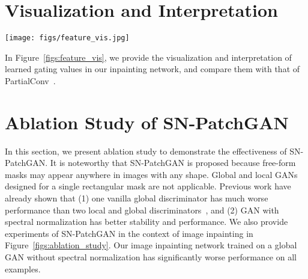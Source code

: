 \documentclass[10pt,twocolumn,letterpaper]{article}
\begin{document}
\section{Visualization and Interpretation} \label{secs:vis_network}
\begin{figure*}[ht]
  \centering
  \vspace*{-1cm}
  \texttt{[image: figs/feature\_vis.jpg]}

  \caption{Comparisons of gated convolution and partial convolution with visualization and interpretation of learned gating values. We first show our inpainting network architecture based on~\cite{yu2018generative} by replacing all convolutions with gated convolutions in the 1st row. Note that for simplicity, the following refinement network in~\cite{yu2018generative} is ignored in the figure. With same settings, we train two models based on gated convolution and partial convolution separately. We then directly visualize intermediate un-normalized gating values in the 2nd row. The values differ mainly based on three parts: \textbf{background}, \textbf{mask} and \textbf{sketch}. In the 3rd row, we provide an interpretation based on which part(s) have higher gating values. Interestingly we also find that for some channels (\eg~channel-31 of the layer after dilated convolution), the learned gating values are based on foreground/background semantic segmentation. For comparison, we also visualize the un-learnable fixed binary mask  of partial convolution in the 4th row.}
  \label{figs:feature_vis}
\end{figure*}
In Figure~\ref{figs:feature_vis}, we provide the visualization and interpretation of learned gating values in our inpainting network, and compare them with that of PartialConv~\cite{liu2018image}.

\section{Ablation Study of SN-PatchGAN} \label{secs:ablation}
In this section, we present ablation study to demonstrate the effectiveness of SN-PatchGAN. It is noteworthy that SN-PatchGAN is proposed because free-form masks may appear anywhere in images with any shape. Global and local GANs~\cite{iizuka2017globally} designed for a single rectangular mask are not applicable. Previous work have already shown that (1) one vanilla global discriminator has much worse performance than two local and global discriminators~\cite{iizuka2017globally}, and (2) GAN with spectral normalization has better stability and performance. We also provide experiments of SN-PatchGAN in the context of image inpainting in Figure~\ref{figs:ablation_study}. Our image inpainting network trained on a global GAN without spectral normalization has significantly worse performance on all examples.
\end{document}
